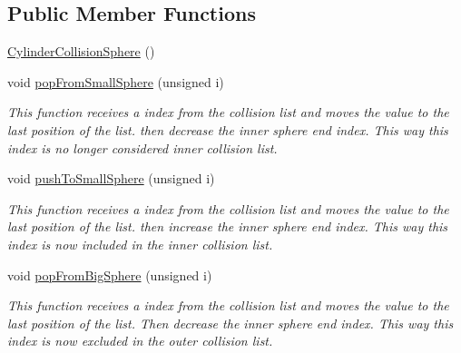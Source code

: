 \subsection*{Public Member Functions}
\begin{DoxyCompactItemize}
\item 
\hyperlink{class_cylinder_collision_sphere_ac4f58e8792fdcdfe475b9556dc804553}{Cylinder\+Collision\+Sphere} ()
\item 
\mbox{\label{class_cylinder_collision_sphere_ad4cfd86c6ab7035b9ba67277792c132f}} 
void \hyperlink{class_cylinder_collision_sphere_ad4cfd86c6ab7035b9ba67277792c132f}{pop\+From\+Small\+Sphere} (unsigned i)
\begin{DoxyCompactList}\small\item\em This function receives a index from the collision list and moves the value to the last position of the list. then decrease the inner sphere end index. This way this index is no longer considered inner collision list. \end{DoxyCompactList}\item 
\mbox{\label{class_cylinder_collision_sphere_aa369aaa1ce839382c915ac4f32ac82ca}} 
void \hyperlink{class_cylinder_collision_sphere_aa369aaa1ce839382c915ac4f32ac82ca}{push\+To\+Small\+Sphere} (unsigned i)
\begin{DoxyCompactList}\small\item\em This function receives a index from the collision list and moves the value to the last position of the list. then increase the inner sphere end index. This way this index is now included in the inner collision list. \end{DoxyCompactList}\item 
\mbox{\label{class_cylinder_collision_sphere_a06a8f75674ef0bcc44a820e948624f60}} 
void \hyperlink{class_cylinder_collision_sphere_a06a8f75674ef0bcc44a820e948624f60}{pop\+From\+Big\+Sphere} (unsigned i)
\begin{DoxyCompactList}\small\item\em This function receives a index from the collision list and moves the value to the last position of the list. Then decrease the inner sphere end index. This way this index is now excluded in the outer collision list. \end{DoxyCompactList}\item 

\end{DoxyCompactItemize}
